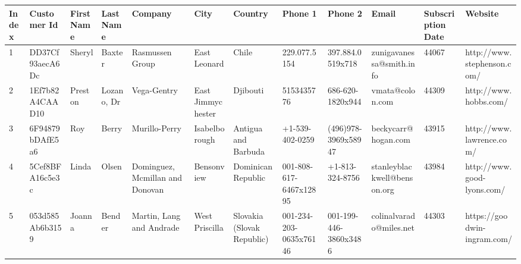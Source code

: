 \documentclass[11pt,a4paper]{article}
\begin{document}
\begin{table}[h]
\begin{tabular}{|l|l|l|l|l|l|l|l|l|l|l|l|}
\hline
Index & Customer Id & First Name & Last Name & Company & City & Country & Phone 1 & Phone 2 & Email & Subscription Date & Website \\ \hline
1 & DD37Cf93aecA6Dc & Sheryl & Baxter & Rasmussen Group & East Leonard & Chile & 229.077.5154 & 397.884.0519x718 & zunigavanessa@smith.info & 44067 & http://www.stephenson.com/ \\ \hline
2 & 1Ef7b82A4CAAD10 & Preston & Lozano, Dr & Vega-Gentry & East Jimmychester & Djibouti & 5153435776 & 686-620-1820x944 & vmata@colon.com & 44309 & http://www.hobbs.com/ \\ \hline
3 & 6F94879bDAfE5a6 & Roy & Berry & Murillo-Perry & Isabelborough & Antigua and Barbuda & +1-539-402-0259 & (496)978-3969x58947 & beckycarr@hogan.com & 43915 & http://www.lawrence.com/ \\ \hline
4 & 5Cef8BFA16c5e3c & Linda & Olsen & Dominguez, Mcmillan and Donovan & Bensonview & Dominican Republic & 001-808-617-6467x12895 & +1-813-324-8756 & stanleyblackwell@benson.org & 43984 & http://www.good-lyons.com/ \\ \hline
5 & 053d585Ab6b3159 & Joanna & Bender & Martin, Lang and Andrade & West Priscilla & Slovakia (Slovak Republic) & 001-234-203-0635x76146 & 001-199-446-3860x3486 & colinalvarado@miles.net & 44303 & https://goodwin-ingram.com/ \\ \hline
\end{tabular}
\end{table}
\end{document}
